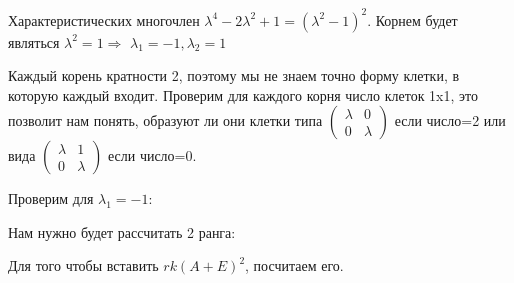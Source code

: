 \documentclass[a4paper,12pt]{article}
\begin{document}
\begin{enumerate}
Характеристических многочлен $\lambda^4-2\lambda^2+1=(\lambda^2 -1)^2$. Корнем будет являться $\lambda^2 = 1 \Rightarrow$ $\lambda_1 = -1, \lambda_2 = 1$

Каждый корень кратности 2, поэтому мы не знаем точно форму клетки, в которую каждый входит. Проверим для каждого корня число клеток 1x1, это позволит нам понять, образуют ли они клетки типа $\begin{pmatrix}
\lambda & 0\\
0& \lambda
\end{pmatrix}$ если число=2 или вида $\begin{pmatrix}
\lambda & 1\\
0& \lambda
\end{pmatrix}$ если число=0.

Проверим для $\lambda_1 = -1$:

Нам нужно будет рассчитать 2 ранга:

Для того чтобы вставить $rk(A+E)^2$, посчитаем его.



\end{enumerate}
\end{document}
